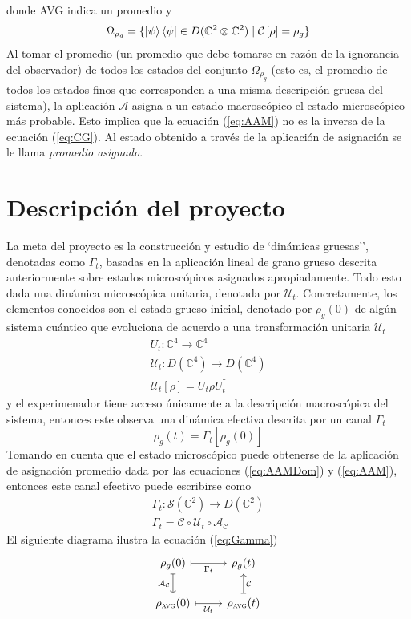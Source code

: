 \documentclass[onecolumn,10pt]{article}
\newcommand{\mcU}{\mathcal{U}}
\newcommand{\mcS}{\mathcal{S}}
\newcommand{\mcC}{\mathcal{C}}
\newcommand{\mcA}{\mathcal{A}}
\newcommand{\Complex}{\mathbb{C}} %
\newcommand{\CG}[1]{\mcC\left[#1\right]}
\begin{document}
donde \textsc{AVG} indica un promedio y
\begin{equation}
\Omega_{\rho_{g}}=\{\ket{\psi}\bra{\psi}\in D(\Complex^{2}\otimes\Complex^{2}) \mid \CG{\rho}=\rho_{g}\}
\end{equation}
Al tomar el promedio (un promedio que debe tomarse en razón de la ignorancia del observador) de todos los estados del conjunto $\Omega_{\rho_{g}}$ (esto es, el promedio de todos los estados finos que corresponden a una misma descripción gruesa del sistema), la aplicación $\mcA$ asigna a un estado macroscópico el estado microscópico más probable. Esto implica que la ecuación (\ref{eq:AAM}) no es la inversa de la ecuación (\ref{eq:CG}). Al estado obtenido a través de la aplicación de asignación se le llama \textit{promedio asignado}.
\vspace{0.5cm}
\section{Descripción del proyecto}
La meta del proyecto es la construcción y estudio de `dinámicas gruesas'', denotadas como $\Gamma_t$, basadas en la aplicación lineal de grano grueso descrita anteriormente sobre estados microscópicos asignados apropiadamente. Todo esto dada una dinámica microscópica unitaria, denotada por $\mcU_t$. Concretamente, los elementos conocidos son el estado grueso inicial, denotado por $\rho_g(0)$ de algún sistema cuántico que evoluciona de acuerdo a una transformación unitaria $\mcU_t$
\begin{gather}
U_{t}:\Complex^{4} \rightarrow \Complex^{4} \label{eq:UnitOpDyn}\\
\mcU_{t}:D(\Complex^{4})\rightarrow D(\Complex^{4}) \label{eq:UnitChaDyn}\\
\mcU_{t}[\rho]=U_{t}\rho U_{t}^{\dag}
\end{gather}
y el experimenador tiene acceso únicamente a la descripción macroscópica del sistema, entonces este observa una dinámica efectiva descrita por un canal $\Gamma_{t}$
\begin{equation}
\rho_{g}(t)=\Gamma_{t}[\rho_{g}(0)]
\end{equation}
Tomando en cuenta que el estado microscópico puede obtenerse de la aplicación de asignación promedio dada por las ecuaciones (\ref{eq:AAMDom}) y (\ref{eq:AAM}), entonces este canal efectivo puede escribirse como
\begin{gather}
\Gamma_{t}:\mcS(\Complex^{2})\rightarrow D(\Complex^{2})\label{eq:GammaDom}\\
\Gamma_{t}=\mcC\circ\mcU_{t}\circ\mcA_{\mcC}\label{eq:Gamma}
\end{gather}
El siguiente diagrama ilustra la ecuación (\ref{eq:Gamma})
\[\begin{tikzcd}[arrows={<-|}]
\rho_{g}(0)  & \rho_{g}(t) \arrow{l}{\Gamma_{t}} \arrow{d}{\mcC}\\
\rho_{\textsc{avg}}(0) \arrow{u}{\mcA_{\mcC}} & \rho_{\textsc{avg}}(t) \arrow{l}{\mcU_{t}}
\end{tikzcd}
\]
\end{document}
